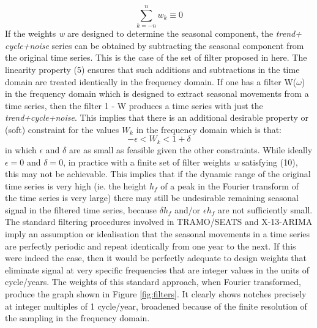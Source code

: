 \documentclass[english,blauw]{cbsdiscussionpaper}
\begin{document}
\begin{equation}
\sum \limits_{k=-n}^n w_k \equiv 0
\end{equation}
If the weights \textit{w} are designed to determine the seasonal component, the \textit{trend+ cycle+noise} series can be obtained by subtracting the seasonal component from the original time series. This is the case of the set of filter proposed in here. The linearity property (5) ensures that such additions and subtractions in the time domain are treated identically in the frequency domain. If one has a filter W($\omega$) in the frequency domain which is designed to extract seasonal movements from a time series, then the filter 1 - W produces a time series with just the \textit{trend+cycle+noise}. This implies that there is an additional desirable property or (soft) constraint for the values $W_k$ in the frequency domain which is that:
\begin{equation}
-\epsilon < W_k < 1+\delta
\end{equation}
in which $\epsilon$ and $\delta$ are as small as feasible given the other constraints. While ideally $\epsilon=0$ and $\delta=0$, in practice with a finite set of filter weights \textit{w} satisfying (10), this may not be achievable. This implies that if the dynamic range of the original time series is very high (ie. the height $h_f$ of a peak in the Fourier transform of the time series is very large) there may still be undesirable remaining seasonal signal in the filtered time series, because $\delta h_f$ and/or $\epsilon h_f$ are not sufficiently small.\\The standard filtering procedures involved in TRAMO/SEATS and X-13-ARIMA imply an assumption or idealisation that the seasonal movements in a time series are perfectly periodic and repeat identically from one year to the next. If this were indeed the case, then it would be perfectly adequate to design weights that eliminate signal at very specific frequencies that are integer values in the units of cycle/years. The weights of this standard approach, when Fourier transformed, produce the graph shown in Figure \ref{fig:filters}. It clearly shows notches precisely at integer multiples of 1 cycle/year, broadened because of the finite resolution of the sampling in the frequency domain.\\
\end{document}
